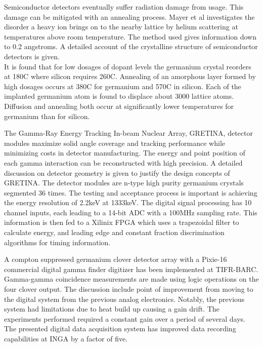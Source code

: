 \documentclass[12pt]{article}
\begin{document}
\begin{doublespacing}
\textbf{\cite{Mayer}}
Semiconductor detectors eventually suffer radiation damage from usage.
This damage can be mitigated with an annealing process.
Mayer et al investigates the disorder a heavy ion brings on to the nearby lattice by helium scattering at temperatures above room temperature.
The method used gives information down to 0.2 angstroms.
A detailed account of the crystalline structure of semiconductor detectors is given.
\\

It is found that for low dosages of dopant levels the germanium crystal reorders at 180C where silicon requires 260C.
Annealing of an amorphous layer formed by high dosages occurs at 380C for germanium and 570C in silicon.
Each of the implanted germanium atom is found to displace about 3000 lattice atoms.
Diffusion and annealing both occur at significantly lower temperatures for germanium than for silicon.


\textbf{\cite{Paschalis201344}}
The Gamma-Ray Energy Tracking In-beam Nuclear Array, GRETINA, detector modules maximize solid angle coverage and tracking performance while minimizing costs in detector manufacturing.
The energy and point position of each gamma interaction can be reconstructed with high precision.
A detailed discussion on detector geometry is given to justify the design concepts of GRETINA.
The detector modules are n-type high purity germanium crystals segmented 36 times.
The testing and acceptance process is important is achieving the energy resolution of 2.2keV at 1333keV.
The digital signal processing has 10 channel inputs, each leading to a 14-bit ADC with a 100MHz sampling rate.
This information is then fed to a Xilinix FPGA which uses a trapezoidal filter to calculate energy, and leading edge and constant fraction discrimination algorithms for timing information.


\textbf{\cite{Palit201290}}
A compton suppressed germanium clover detector array with a Pixie-16 commercial digital gamma finder digitizer has been implemented at TIFR-BARC.
Gamma-gamma coincidence measurements are made using logic operations on the four clover output.
The discussion include point of improvement from moving to the digital system from the previous analog electronics.
Notably, the previous system had limitations due to heat build up causing a gain drift.
The experiments performed required a constant gain over a period of several days.
The presented digital data acquisition system has improved data recording capabilities at INGA by a factor of five.



\end{doublespacing}
\end{document}
